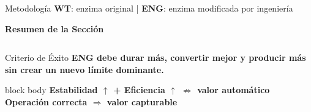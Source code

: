 \begin{frame}{Metodología \hfill{\tiny\color{TextoSuave}\textbf{WT}: enzima original \quad | \quad \textbf{ENG}: enzima modificada por ingeniería}}



{\color{Cian}\bfseries Resumen de la Sección}\par
\vspace{0.08cm}

\begin{columns}[T,onlytextwidth]
\end{columns}

\vspace{0.13cm}
\begin{alertblock}{Criterio de Éxito}
\centering\small\bfseries
ENG debe durar más, convertir mejor y producir más sin crear un nuevo límite dominante.
\end{alertblock}

\vspace{0.10cm}
\begin{beamercolorbox}[wd=\linewidth,sep=0.10cm,rounded=true,center]{block body}
\small\bfseries\color{CianClaro}
Estabilidad $\uparrow$ + Eficiencia $\uparrow$ $\not\Rightarrow$ valor automático
\qquad
Operación correcta $\Rightarrow$ valor capturable
\end{beamercolorbox}

\vfill
\begin{columns}[b,onlytextwidth]
\raggedleft{}
\end{columns}
\end{frame}
